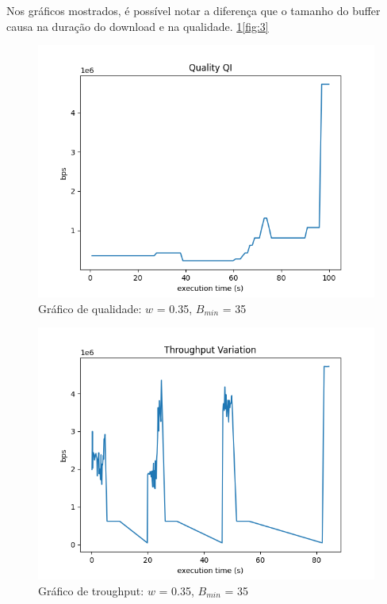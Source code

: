 \documentclass[10pt,twocolumn,letterpaper]{article}
\begin{document}
	Nos gráficos mostrados, é possível notar a diferença que o tamanho do buffer causa na duração do download e na qualidade. \ref{fig:1}\ref{fig:3}
	\begin{figure}
		\centering
		\includegraphics[width=\linewidth]{0.35 - 35 - qual.png}
		\caption{Gráfico de qualidade: $w$ = 0.35, $B_{min}$ = 35}
		\label{fig:1}
	\end{figure}
	\begin{figure}
		\centering
		\includegraphics[width=\linewidth]{0.358 -35 -throughput.png}
		\caption{Gráfico de troughput: $w$ = 0.35, $B_{min}$ = 35}
		\label{fig:2}
	\end{figure}
\end{document}
